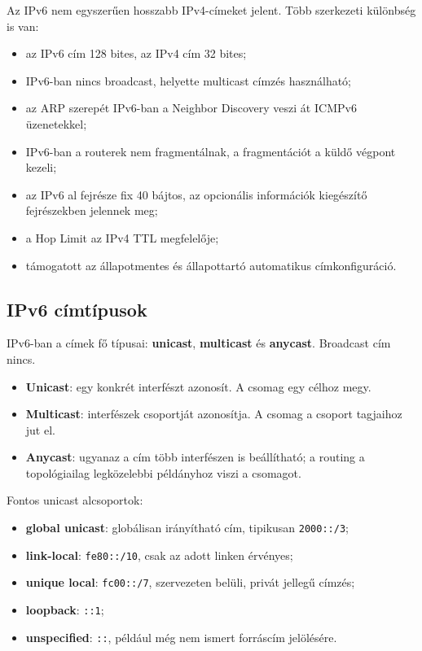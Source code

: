 Az IPv6 nem egyszerűen hosszabb IPv4-címeket jelent. Több szerkezeti különbség is van:

\begin{itemize}
  \item az IPv6 cím 128 bites, az IPv4 cím 32 bites;
  \item IPv6-ban nincs broadcast, helyette multicast címzés használható;
  \item az ARP szerepét IPv6-ban a Neighbor Discovery veszi át ICMPv6 üzenetekkel;
  \item IPv6-ban a routerek nem fragmentálnak, a fragmentációt a küldő végpont kezeli;
  \item az IPv6 al fejrésze fix 40 bájtos, az opcionális információk kiegészítő fejrészekben jelennek meg;
  \item a Hop Limit az IPv4 TTL megfelelője;
  \item támogatott az állapotmentes és állapottartó automatikus címkonfiguráció.
\end{itemize}

\subsection{IPv6 címtípusok}

IPv6-ban a címek fő típusai: \textbf{unicast}, \textbf{multicast} és \textbf{anycast}. Broadcast cím nincs.

\begin{itemize}
  \item \textbf{Unicast}: egy konkrét interfészt azonosít. A csomag egy célhoz megy.
  \item \textbf{Multicast}: interfészek csoportját azonosítja. A csomag a csoport tagjaihoz jut el.
  \item \textbf{Anycast}: ugyanaz a cím több interfészen is beállítható; a routing a topológiailag legközelebbi példányhoz viszi a csomagot.
\end{itemize}

Fontos unicast alcsoportok:

\begin{itemize}
  \item \textbf{global unicast}: globálisan irányítható cím, tipikusan \texttt{2000::/3};
  \item \textbf{link-local}: \texttt{fe80::/10}, csak az adott linken érvényes;
  \item \textbf{unique local}: \texttt{fc00::/7}, szervezeten belüli, privát jellegű címzés;
  \item \textbf{loopback}: \texttt{::1};
  \item \textbf{unspecified}: \texttt{::}, például még nem ismert forráscím jelölésére.
\end{itemize}

